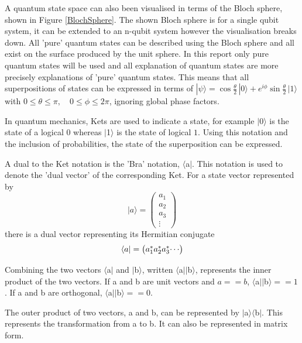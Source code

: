 \documentclass[authoryearcitations]{UoYCSproject}
\begin{document}
A quantum state space can also been visualised in terms of the Bloch sphere, shown in Figure \ref{BlochSphere}.
The shown Bloch sphere is for a single qubit system, it can be extended to an n-qubit system however the visualisation breaks down.
All 'pure' quantum states can be described using the Bloch sphere and all exist on the surface produced by the unit sphere.
In this report only pure quantum states will be used and all explanation of quantum states are more precisely explanations of 'pure' quantum states.
This means that all superpositions of states can be expressed in terms of $|\psi\rangle = \cos \frac{\theta}{2} \, |0 \rangle +  e^{i \phi}  \sin \frac{\theta}{2}  \,|1 \rangle $ with $0 \leq \theta \leq \pi, \quad  0 \leq \phi \leq 2 \pi$, ignoring global phase factors\cite{BlochSphereTalk}.

In quantum mechanics, Kets are used to indicate a state, for example $\vert$0$\rangle$ is the state of a logical $0$ whereas $\vert$1$\rangle$ is the state of logical $1$.
Using this notation and the inclusion of probabilities, the state of the superposition can be expressed.

A dual to the Ket notation is the 'Bra' notation, $\langle$a$\vert$.
This notation is used to denote the 'dual vector' of the corresponding Ket.
For a state vector represented by
\begin{equation}\label{ket_explanation_example}
\vert
a
\rangle = 
\begin{pmatrix}
a_1\\
a_2\\
a_3\\
\vdots
\end{pmatrix}
\end{equation}
there is a dual vector representing its Hermitian conjugate
\begin{equation}\label{bra_explanation_example}
\langle
a
\vert = 
\begin{pmatrix}
a_1^*$$
a_2^*$$
a_3^*$$
\cdots
\end{pmatrix}
\end{equation}

Combining the two vectors $\langle$a$\vert$ and $\vert$b$\rangle$, written $\langle$a$\vert\vert$b$\rangle$, represents the inner product of the two vectors.
If a and b are unit vectors and $a == b$, $\langle$a$\vert\vert$b$\rangle == 1$.
If a and b are orthogonal, $\langle$a$\vert\vert$b$\rangle == 0$.

The outer product of two vectors, a and b, can be represented by $\vert$a$\rangle$$\langle$b$\vert$.
This represents the transformation from a to b.
It can also be represented in matrix form.
\end{document}
